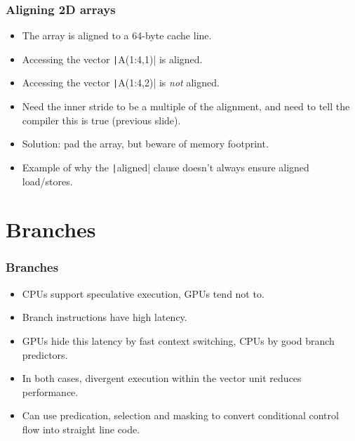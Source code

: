 \documentclass{beamer}
\begin{document}
\begin{frame}
\frametitle{Aligning 2D arrays}

\begin{adjustbox}{max width={\textwidth}}
\end{adjustbox}

\begin{itemize}
  \item The array is aligned to a 64-byte cache line.
  \item<2-> Accessing the vector \texttt|A(1:4,1)| is aligned.
  \item<3-> Accessing the vector \texttt|A(1:4,2)| is \emph{not} aligned.
  \vfill
  \item<4-> Need the inner stride to be a multiple of the alignment, and need to tell the compiler this is true (previous slide).
  \item<4-> Solution: pad the array, but beware of memory footprint.
  \item<4-> Example of why the \texttt|aligned| clause doesn't always ensure aligned load/stores.
\end{itemize}

\end{frame}

\section{Branches}
\begin{frame}
\frametitle{Branches}
\begin{itemize}
  \item CPUs support speculative execution, GPUs tend not to.
  \item Branch instructions have high latency.
  \item GPUs hide this latency by fast context switching, CPUs by good branch predictors.
  \item In both cases, divergent execution within the vector unit reduces performance.
  \item Can use predication, selection and masking to convert conditional control flow into straight line code.
\end{itemize}
\end{frame}
\end{document}
